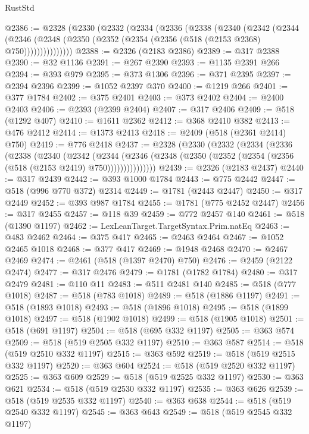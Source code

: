 \begin{lexlean}{RustStd}
\begin{coremodule}
@2386 := @2328
    (@2330
      (@2332
        (@2334
          (@2336
            (@2338
              (@2340
                (@2342
                  (@2344
                    (@2346
                      (@2348 (@2350 (@2352 (@2354 (@2356 (@518 (@2153 @2368) @750)))))))))))))))
@2388 := @2326 (@2183 @2386)
@2389 := @317 @2388
@2390 := @32 @1136
@2391 := @267 @2390
@2393 := @1135 @2391 @266
@2394 := @393 @979
@2395 := @373 @1306
@2396 := @371 @2395
@2397 := @2394 @2396
@2399 := @1052 @2397 @370
@2400 := @1219 @266
@2401 := @377 @1784
@2402 := @375 @2401
@2403 := @373 @2402
@2404 := @2400 @2403
@2406 := @2393 (@2399 @2404)
@2407 := @317 @2406
@2409 := @518 (@1292 @407)
@2410 := @1611 @2362
@2412 := @368 @2410 @382
@2413 := @476 @2412
@2414 := @1373 @2413
@2418 := @2409 (@518 (@2361 @2414) @750)
@2419 := @776 @2418
@2437 := @2328
    (@2330
      (@2332
        (@2334
          (@2336
            (@2338
              (@2340
                (@2342
                  (@2344
                    (@2346
                      (@2348 (@2350 (@2352 (@2354 (@2356 (@518 (@2153 @2419) @750)))))))))))))))
@2439 := @2326 (@2183 @2437)
@2440 := @317 @2439
@2442 := @393 @1000 @1784
@2443 := @775 @2442
@2447 := @518 (@996 @770 @372) @2314
@2449 := @1781 (@2443 @2447)
@2450 := @317 @2449
@2452 := @393 @987 @1784
@2455 := @1781 (@775 @2452 @2447)
@2456 := @317 @2455
@2457 := @118 @39
@2459 := @772 @2457 @140
@2461 := @518 (@1390 @1197)
@2462 := LexLeanTarget.TargetSyntax.Prim.natEq
@2463 := @483 @2462
@2464 := @375 @417
@2465 := @2463 @2464
@2467 := @1052 @2465 @1018
@2468 := @377 @417
@2469 := @1948 @2468
@2470 := @2467 @2469
@2474 := @2461 (@518 (@1397 @2470) @750)
@2476 := @2459 (@2122 @2474)
@2477 := @317 @2476
@2479 := @1781 (@1782 @1784)
@2480 := @317 @2479
@2481 := @110 @11
@2483 := @511 @2481 @140
@2485 := @518 (@777 @1018)
@2487 := @518 (@783 @1018)
@2489 := @518 (@1886 @1197)
@2491 := @518 (@1893 @1018)
@2493 := @518 (@1896 @1018)
@2495 := @518 (@1899 @1018)
@2497 := @518 (@1902 @1018)
@2499 := @518 (@1905 @1018)
@2501 := @518 (@691 @1197)
@2504 := @518 (@695 @332 @1197)
@2505 := @363 @574
@2509 := @518 (@519 @2505 @332 @1197)
@2510 := @363 @587
@2514 := @518 (@519 @2510 @332 @1197)
@2515 := @363 @592
@2519 := @518 (@519 @2515 @332 @1197)
@2520 := @363 @604
@2524 := @518 (@519 @2520 @332 @1197)
@2525 := @363 @609
@2529 := @518 (@519 @2525 @332 @1197)
@2530 := @363 @621
@2534 := @518 (@519 @2530 @332 @1197)
@2535 := @363 @626
@2539 := @518 (@519 @2535 @332 @1197)
@2540 := @363 @638
@2544 := @518 (@519 @2540 @332 @1197)
@2545 := @363 @643
@2549 := @518 (@519 @2545 @332 @1197)

\end{coremodule}
\end{lexlean}
